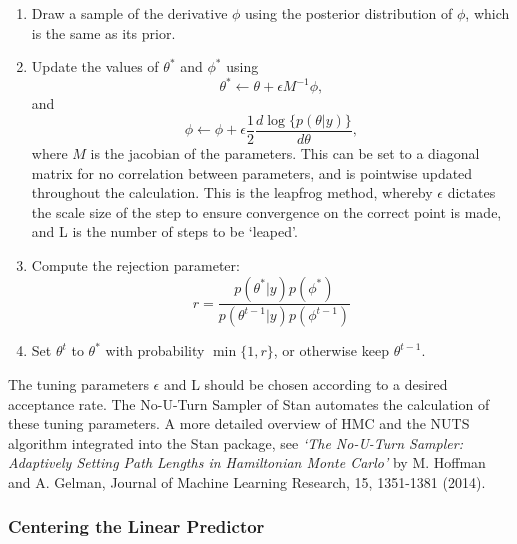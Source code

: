 \documentclass[
]{article}
\begin{document}
\begin{enumerate}
\item Draw a sample of the derivative $\phi$ using the posterior distribution of $\phi$, which is the same as its prior.
\item Update the values of $\theta^*$ and $\phi^*$ using
  \begin{equation}
    \theta^*\leftarrow \theta+\epsilon M^{-1}\phi,
  \end{equation}
  and
  \begin{equation}
    \phi\leftarrow \phi+\epsilon\frac{1}{2}\frac{d\log\{p(\theta|y)\}}{d\theta},
  \end{equation}
where $M$ is the jacobian of the parameters. This can be set to a diagonal matrix for no correlation between parameters, and is pointwise updated throughout the calculation. This is the leapfrog method, whereby $\epsilon$ dictates the scale size of the step to ensure convergence on the correct point is made, and L is the number of steps to be `leaped'.
\item Compute the rejection parameter:
  \begin{equation}
    r=\frac{p(\theta^*|y)p(\phi^*)}{p(\theta^{t-1}|y)p(\phi^{t-1})}
  \end{equation}
\item Set $\theta^t$ to $\theta^*$ with probability $\min\{1,r\}$, or otherwise keep $\theta^{t-1}$.
\end{enumerate}

The tuning parameters \(\epsilon\) and L should be chosen according to a
desired acceptance rate. The No-U-Turn Sampler of Stan automates the
calculation of these tuning parameters. A more detailed overview of HMC
and the NUTS algorithm integrated into the Stan package, see \emph{`The
No-U-Turn Sampler: Adaptively Setting Path Lengths in Hamiltonian Monte
Carlo'} by M. Hoffman and A. Gelman, Journal of Machine Learning
Research, 15, 1351-1381 (2014).

\hypertarget{centering-the-linear-predictor}{%
\subsubsection{Centering the Linear
Predictor}\label{centering-the-linear-predictor}}
\end{document}
